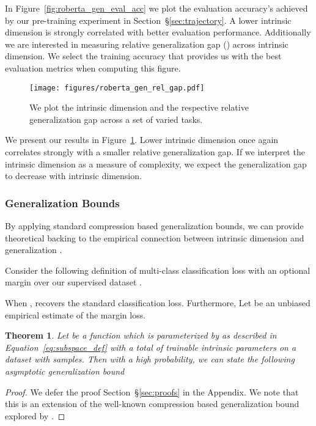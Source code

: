 \documentclass{article} \usepackage{iclr2020_conference,times}
\newtheorem{theorem}{Theorem}
\begin{document}
In Figure~\ref{fig:roberta_gen_eval_acc} we plot the evaluation accuracy's achieved by our pre-training experiment in Section~\S\ref{sec:trajectory}. A lower intrinsic dimension is strongly correlated with better evaluation performance. Additionally we are interested in measuring relative generalization gap () across intrinsic dimension. We select the training accuracy that provides us with the best evaluation metrics when computing this figure. 
\begin{figure}
    \centering
    \texttt{[image: figures/roberta\_gen\_rel\_gap.pdf]}
    \caption{We plot the intrinsic dimension and the respective relative generalization gap across a set of varied tasks.}
    \label{fig:roberta_gen_rel_gap}
\end{figure}

We present our results in Figure~\ref{fig:roberta_gen_rel_gap}. Lower intrinsic dimension once again correlates strongly with a smaller relative generalization gap. If we interpret the intrinsic dimension as a measure of complexity, we expect the generalization gap to decrease with intrinsic dimension.

\subsubsection{Generalization Bounds}
By applying standard compression based generalization bounds, we can provide theoretical backing to the empirical connection between intrinsic dimension and generalization \citep{compression_generalization_gap}.

Consider the following definition of multi-class classification loss with an optional margin over our supervised dataset . 


When ,  recovers the standard classification loss. Furthermore, Let  be an unbiased empirical estimate of the margin loss. 
\begin{theorem}
Let  be a function which is parameterized by  as described in Equation~\ref{eq:subspace_def} with a total of  trainable intrinsic parameters on a dataset with  samples. Then with a high probability, we can state the following asymptotic generalization bound

\end{theorem}
\begin{proof}
We defer the proof Section~\S\ref{sec:proofs} in the Appendix. We note that this is an extension of the well-known compression based generalization bound explored by \cite{compression_generalization_gap}.  
\end{proof}
\end{document}
